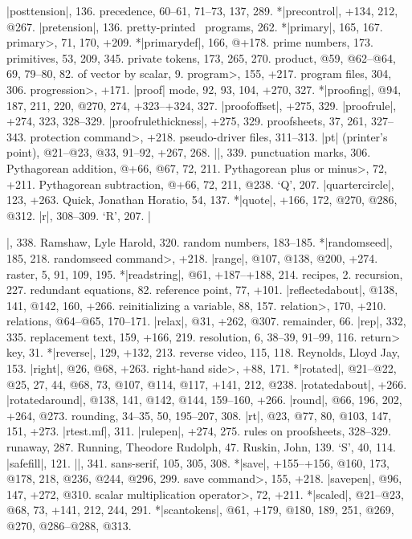 |posttension|, 136.
precedence, 60--61, 71--73, 137, 289.
*|precontrol|, +134, 212, @267.
|pretension|, 136.
pretty-printed \MF\ programs, 262.
*|primary|, 165, 167.
\<primary>, 71, 170, +209.
*|primarydef|, 166, @+178.
prime numbers, 173.
primitives, 53, 209, 345.
private tokens, 173, 265, 270.
product, @59, @62--@64, 69, 79--80, 82.
\sub of vector by scalar, 9.
\<program>, 155, +217.
program files, 304, 306.
\<progression>, +171.
|proof| mode, 92, 93, 104, +270, 327.
*|proofing|, @94, 187, 211, 220, @270, 274, +323--+324, 327.
|proofoffset|, +275, 329.
|proofrule|, +274, 323, 328--329.
|proofrulethickness|, +275, 329.
proofsheets, 37, 261, 327--343.
\<protection command>, +218.
pseudo-driver files, 311--313.
|pt| (printer's point), @21--@23, @33, 91--92, +267, 268.
|\punct|, 339.
punctuation marks, 306.
Pythagorean addition, @+66, @67, 72, 211.
\<Pythagorean plus or minus>, 72, +211.
Pythagorean subtraction, @+66, 72, 211, @238.
\newletter
`Q', 207.
|quartercircle|, 123, +263.
Quick, Jonathan Horatio, 54, 137.
*|quote|, +166, 172, @270, @286, @312.
\newletter
|r|, 308--309.
`R', 207.
|\raggedright|, 338.
Ramshaw, Lyle Harold, 320.
random numbers, 183--185.
*|randomseed|, 185, 218.
\<randomseed command>, +218.
|range|, @107, @138, @200, +274.
raster, 5, 91, 109, 195.
*|readstring|, @61, +187--+188, 214.
recipes, 2.
recursion, 227.
redundant equations, 82.
reference point, 77, +101.
|reflectedabout|, @138, 141, @142, 160, +266.
reinitializing a variable, 88, 157.
\<relation>, 170, +210.
relations, @64--@65, 170--171.
|relax|, @31, +262, @307.
remainder, 66.
|rep|, 332, 335.
replacement text, 159, +166, 219.
resolution, 6, 38--39, 91--99, 116.
\<return> key, 31.
*|reverse|, 129, +132, 213.
reverse video, 115, 118.
Reynolds, Lloyd Jay, 153.
|right|, @26, @68, +263.
\<right-hand side>, +88, 171.
*|rotated|, @21--@22, @25, 27, 44, @68, 73, @107, @114, @117, +141, 212, @238.
|rotatedabout|, +266.
|rotatedaround|, @138, 141, @142, @144, 159--160, +266.
|round|, @66, 196, 202, +264, @273.
rounding, 34--35, 50, 195--207, 308.
|rt|, @23, @77, 80, @103, 147, 151, +273.
|rtest.mf|, 311.
|rulepen|, +274, 275.
rules on proofsheets, 328--329.
runaway, 287.
Running, Theodore Rudolph, 47.
Ruskin, John, 139.
\newletter
`S', 40, 114.
|safefill|, 121.
|\sample|, 341.
sans-serif, 105, 305, 308.
*|save|, +155--+156, @160, 173, @178, 218, @236, @244, @296, 299.
\<save command>, 155, +218.
|savepen|, @96, 147, +272, @310.
\<scalar multiplication operator>, 72, +211.
*|scaled|, @21--@23, @68, 73, +141, 212, 244, 291.
*|scantokens|, @61, +179, @180, 189, 251, @269, @270, @286--@288, @313.
